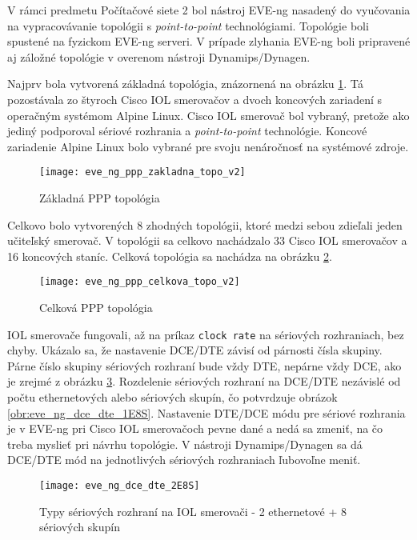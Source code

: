 V rámci predmetu Počítačové siete 2 bol nástroj EVE-ng nasadený do vyučovania na vypracovávanie topológii s \emph{point-to-point} technológiami. Topológie boli spustené na fyzickom EVE-ng serveri. V prípade zlyhania EVE-ng boli pripravené aj záložné topológie v overenom nástroji Dynamips/Dynagen.

Najprv bola vytvorená základná topológia, znázornená na obrázku \ref{obr:eve_ng_ppp_zakladna_topo_v2}. Tá pozostávala zo štyroch Cisco IOL smerovačov a dvoch koncových zariadení s operačným systémom Alpine Linux. Cisco IOL smerovač bol vybraný, pretože ako jediný podporoval sériové rozhrania a \emph{point-to-point} technológie. Koncové zariadenie Alpine Linux bolo vybrané pre svoju nenáročnosť na systémové zdroje.

\begin{figure}
    \centering
    \texttt{[image: eve\_ng\_ppp\_zakladna\_topo\_v2]}
    \caption{Základná PPP topológia}
    \label{obr:eve_ng_ppp_zakladna_topo_v2}
\end{figure}

Celkovo bolo vytvorených 8 zhodných topológii, ktoré medzi sebou zdieľali jeden učiteľský smerovač. V topológii sa celkovo nachádzalo 33 Cisco IOL smerovačov a 16 koncových staníc. Celková topológia sa nachádza na obrázku \ref{obr:eve_ng_ppp_celkova_topo_v2}.

\begin{figure}
    \centering
    \texttt{[image: eve\_ng\_ppp\_celkova\_topo\_v2]}
    \caption{Celková PPP topológia}
    \label{obr:eve_ng_ppp_celkova_topo_v2}
\end{figure}

IOL smerovače fungovali, až na príkaz \texttt{clock rate} na sériových rozhraniach, bez chyby. Ukázalo sa, že nastavenie DCE/DTE závisí od párnosti čísla skupiny. Párne číslo skupiny sériových rozhraní bude vždy DTE, nepárne vždy DCE, ako je zrejmé z obrázku \ref{obr:eve_ng_dce_dte_2E8S}. Rozdelenie sériových rozhraní na DCE/DTE nezávislé od počtu ethernetových alebo sériových skupín, čo potvrdzuje obrázok \ref{obr:eve_ng_dce_dte_1E8S}. Nastavenie DTE/DCE módu pre sériové rozhrania je v EVE-ng pri Cisco IOL smerovačoch pevne dané a nedá sa zmeniť, na čo treba myslieť pri návrhu topológie. V nástroji Dynamips/Dynagen sa dá DCE/DTE mód na jednotlivých sériových rozhraniach ľubovoľne meniť.

\begin{figure}
    \centering
    \texttt{[image: eve\_ng\_dce\_dte\_2E8S]}
    \caption{Typy sériových rozhraní na IOL smerovači - 2 ethernetové + 8 sériových skupín}
    \label{obr:eve_ng_dce_dte_2E8S}
\end{figure}

